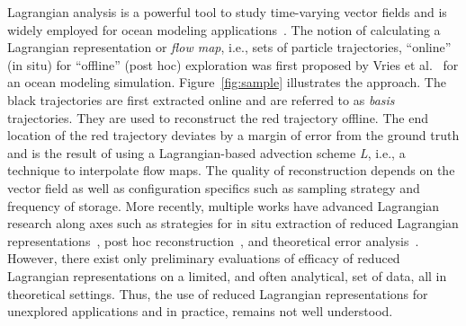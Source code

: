 %
Lagrangian analysis is a powerful tool to study time-varying vector fields and is widely employed for ocean modeling applications~\cite{VANSEBILLE201849}.
%
The notion of calculating a Lagrangian representation or \textit{flow map}, i.e., sets of particle trajectories, ``online'' (in situ) for ``offline'' (post hoc) exploration was first proposed by Vries et al.~\cite{vries2001calculating} for an ocean modeling simulation.
%
Figure~\ref{fig:sample} illustrates the approach.
%
The black trajectories are first extracted online and are referred to as \textit{basis} trajectories.
%
They are used to reconstruct the red trajectory offline.
%
The end location of the red trajectory deviates by a margin of error from the ground truth and is the result of using a Lagrangian-based advection scheme \textit{L}, i.e., a technique to interpolate flow maps.
%
The quality of reconstruction depends on the vector field as well as configuration specifics such as sampling strategy and frequency of storage. 
%
More recently, multiple works have advanced Lagrangian research along axes such as strategies for in situ extraction of reduced Lagrangian representations~\cite{agranovsky2014improved}\cite{rapp2019void}\cite{sane2020scalable}, post hoc reconstruction~\cite{chandler2015interpolation}\cite{sane2019interpolation}\cite{Jakob20}, and theoretical error analysis~\cite{bujack2015lagrangian}\cite{chandler2016analysis}\cite{hummel2016error}.
%
%
However, there exist only preliminary evaluations of efficacy of reduced Lagrangian representations on a limited, and often analytical, set of data, all in theoretical settings.
%
%
Thus, the use of reduced Lagrangian representations for unexplored applications and in practice, remains not well understood.
%
%

